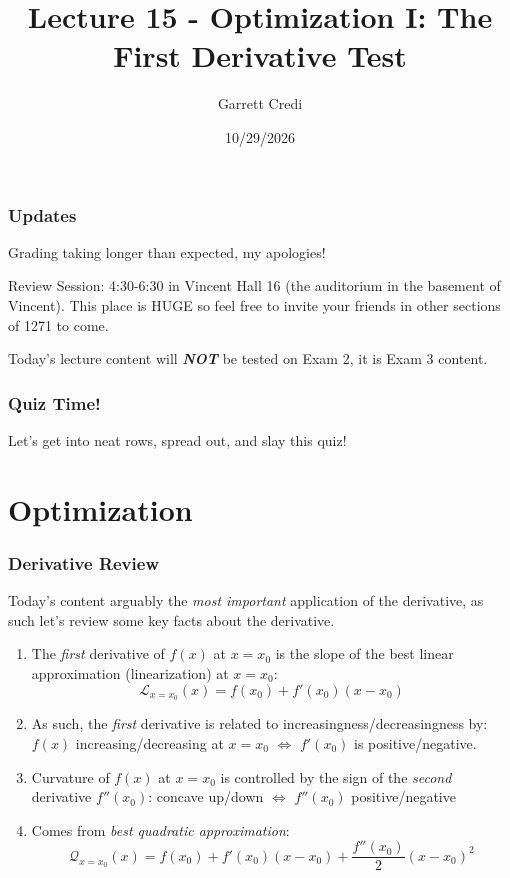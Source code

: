 \documentclass{ltx-talk}
\title{Lecture 15 - Optimization I: The First Derivative Test}
\author{Garrett Credi}
\date{10/29/2026}
\begin{document}
\begin{frame}
  \maketitle
\end{frame}

\begin{frame}
  \frametitle{Updates}

  Grading taking longer than expected, my apologies!

  Review Session: 4:30-6:30 in Vincent Hall 16 (the auditorium in the basement of Vincent). This place is HUGE so feel free to invite your friends in other sections of 1271 to come.

  Today's lecture content will \textit{\textbf{NOT}} be tested on Exam 2, it is Exam 3 content.
\end{frame}

\begin{frame}
  \frametitle{Quiz Time!}

  Let's get into neat rows, spread out, and slay this quiz!
\end{frame}

\section{Optimization}
\begin{frame}
  \frametitle{Derivative Review}

  Today's content arguably the \textit{most important} application of the derivative, \pause as such let's review some key facts about the derivative. \pause

  \begin{enumerate}
    \item The \textit{first} derivative of $f(x)$ at $x = x_0$ is the slope of the best linear approximation (linearization) at $x = x_0$: \pause
      \begin{equation}
        \mathscr{L}_{x = x_0}(x) = f(x_0) + f'(x_0)(x - x_0)
      \end{equation} \pause
    \item As such, the \textit{first} derivative is related to increasingness/decreasingness by: \pause $f(x)$ increasing/decreasing at $x = x_0$ $\iff$ $f'(x_0)$ is positive/negative. \pause
    \item Curvature of $f(x)$ at $x = x_0$ is controlled by \pause the sign of the \textit{second} derivative $f''(x_0)$: \pause concave up/down $\iff$ $f''(x_0)$ positive/negative \pause
    \item Comes from \textit{best quadratic approximation}:
      \begin{equation}
        \mathscr{Q}_{x = x_0}(x) = f(x_0) + f'(x_0)(x - x_0) + \dfrac{f''(x_0)}{2}(x - x_0)^2
      \end{equation}
  \end{enumerate}
\end{frame}
\end{document}
